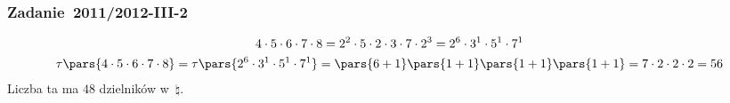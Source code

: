 \subsubsection*{Zadanie~2011/2012-III-2}
\begin{gather*}
    4 \cdot 5 \cdot 6 \cdot 7 \cdot 8
    = 2^2 \cdot 5 \cdot 2 \cdot 3 \cdot 7 \cdot 2^3
    = 2^6 \cdot 3^1 \cdot 5^1 \cdot 7^1\\
    \tau\pars{4 \cdot 5 \cdot 6 \cdot 7 \cdot 8}
    = \tau\pars{2^6 \cdot 3^1 \cdot 5^1 \cdot 7^1}
    = \pars{6 + 1}\pars{1 + 1}\pars{1 + 1}\pars{1 + 1}
    = 7 \cdot 2 \cdot 2 \cdot 2
    = 56
\end{gather*}
Liczba ta ma \(48\) dzielników w~\(\natural\).

